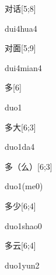 \begin{verbete}{对话}[5;8]
\begin{pronuncia}{dui4hua4}
\end{pronuncia}
\end{verbete}

\begin{verbete}{对面}[5;9]
\begin{pronuncia}{dui4mian4}
\end{pronuncia}
\end{verbete}

\begin{verbete}[duo1]{多}[6]
\begin{pronuncia}{duo1}
\end{pronuncia}
\end{verbete}

\begin{verbete}[duo1da4]{多大}[6;3]
\begin{pronuncia}{duo1da4}
\end{pronuncia}
\end{verbete}

\begin{verbete}[duo1(me0)]{多（么）}[6;3]
\begin{pronuncia}{duo1(me0)}
\end{pronuncia}
\end{verbete}

\begin{verbete}{多少}[6;4]
\begin{pronuncia}{duo1shao0}
\end{pronuncia}
\end{verbete}

\begin{verbete}{多云}[6;4]
\begin{pronuncia}{duo1yun2}
\end{pronuncia}
\end{verbete}

